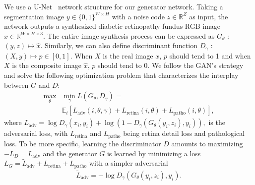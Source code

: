 \documentclass[letterpaper]{article} %
\begin{document}
    We use a U-Net~\cite{ronneberger2015u} network structure for our generator network.%
	Taking a segmentation image $y \in \{ 0,1 \}^{W \times H}$ with a noise code $z \in \mathbb{R}^Z $ as input, the network outputs a synthesized diabetic retinopathy fundus RGB image $\hat{x} \in \mathbb{R}^{W \times H \times 3}$.
	The entire image synthesis process can be expressed as $G_{\theta}$ : $ ( y,z ) \mapsto \hat{x}$. Similarly, we can also define discriminant function $D_{\gamma}$ : $ ( X , y) \mapsto p \in [0,1] $. When $X$ is the real image $x$, $p$ should tend to 1 and when $X$ is the composite image $\hat{x}$, $p$ should tend to 0.
	We follow the GAN's strategy and solve the  following optimization problem that characterizes the interplay between $ G $ and $ D $:
	\begin{align}
	\label{align_allloss} \textstyle
	\max_{\theta} & \textstyle\min_{\gamma} L(G_{\theta}, D_{\gamma}) = \nonumber \\
	&\mathbb{E}_i [L_\mathrm{adv}(i, \theta, \gamma) + L_\mathrm{retina}(i, \theta)
	  + L_\mathrm{patho} (i, \theta)],
	\end{align}
	where $
	L_\mathrm{adv} = \log D_\gamma(x_i, y_i) +
	 \log(1 - D_\gamma(G_\theta(y_i,z_i),y_i)),
	$ is the adversarial loss, with $ L_\mathrm{retina} $ and $ L_\mathrm{patho} $ being retina detail loss and pathological loss.
	To be more specific, learning the discriminator $ D $ amounts to maximizing $ -L_D = L_\mathrm{adv} $
	and the generator $ G $ is learned by minimizing a loss $ L_G = \tilde L_\mathrm{adv} + L_\mathrm{retina} + L_\mathrm{patho} $ with a simpler adversarial
	\begin{align}
	\label{align_Gloss} \textstyle
	\tilde L_\mathrm{adv} = -\log D_\gamma (G_\theta(y_i, z_i),y_i) .
	\end{align}


\end{document}

